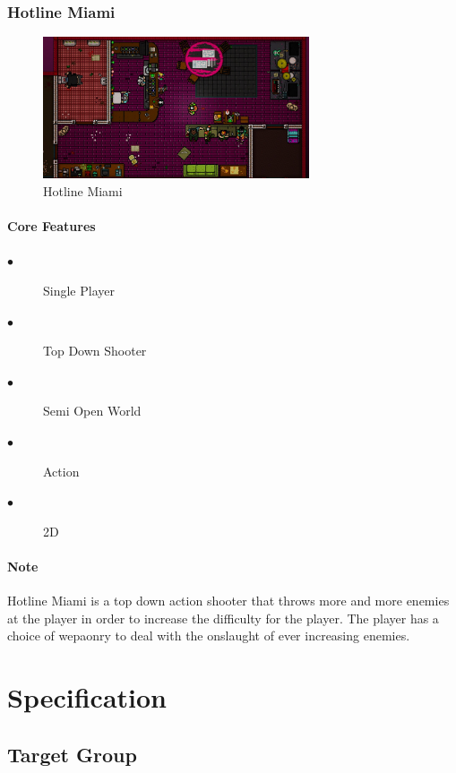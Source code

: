 \documentclass[a4paper]{scrreprt}
\begin{document}
        \subsection{Hotline Miami}

        \begin{figure}[H]
            \centering
            \includegraphics[width=0.70\textwidth]{hotline-miami.jpg}
            \caption{\label{fig:art} Hotline Miami}
        \end{figure}

        \subsubsection{Core Features}
        \begin{description}
            \item[$\bullet$] Single Player
            \item[$\bullet$] Top Down Shooter
            \item[$\bullet$] Semi Open World
            \item[$\bullet$] Action
            \item[$\bullet$] 2D
        \end{description}

        \subsubsection{Note}
        Hotline Miami is a top down action shooter that throws more and more enemies at the player in order to increase the difficulty for the player. 
        The player has a choice of wepaonry to deal with the onslaught of ever increasing enemies.   

    \chapter{Specification}

    \section{Target Group}
\end{document}
